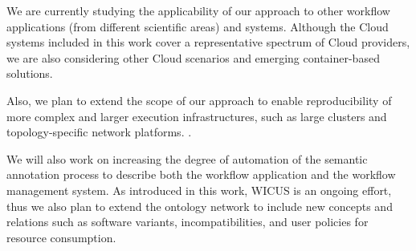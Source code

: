 We are currently studying the applicability of our approach to other 
workflow applications (from different scientific areas) and systems. Although
the Cloud systems included in this work cover a representative spectrum of 
Cloud providers, we are also considering other Cloud scenarios and 
emerging container-based solutions. 

Also, we plan to extend the scope of our approach to enable reproducibility of 
more complex and larger execution infrastructures, such as large clusters and topology-specific 
network platforms. .

We will also work on increasing  the degree of automation of the semantic annotation process to describe both the workflow application and the workflow management system. As introduced in this work, WICUS is an ongoing effort, thus we also plan to extend the ontology network to include new concepts and relations such as software variants, incompatibilities, and user policies for resource consumption.




